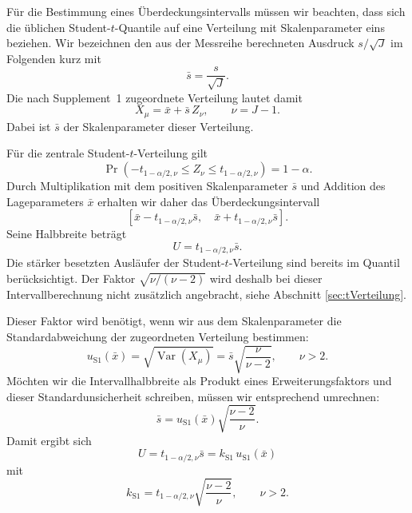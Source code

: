 Für die Bestimmung eines Überdeckungsintervalls müssen wir beachten,
dass sich die üblichen Student-$t$-Quantile auf eine Verteilung
mit Skalenparameter eins beziehen.
Wir bezeichnen den aus der Messreihe berechneten Ausdruck
$s/\sqrt J$ im Folgenden kurz mit
\begin{equation}
\bar s=\frac{s}{\sqrt J}.
\end{equation}
Die nach Supplement~1 zugeordnete Verteilung lautet damit
\begin{equation}
X_\mu=\bar x+\bar s\,Z_\nu,
\qquad \nu=J-1.
\end{equation}
Dabei ist $\bar s$ der Skalenparameter dieser Verteilung.

Für die zentrale Student-$t$-Verteilung gilt
\begin{equation}
\Pr\!\left(
-t_{1-\alpha/2,\nu}
\leq Z_\nu
\leq t_{1-\alpha/2,\nu}
\right)
=1-\alpha.
\end{equation}
Durch Multiplikation mit dem positiven Skalenparameter $\bar s$
und Addition des Lageparameters $\bar x$ erhalten wir daher
das Überdeckungsintervall
\begin{equation}
\boxed{
\left[
\bar x-t_{1-\alpha/2,\nu}\bar s,
\quad
\bar x+t_{1-\alpha/2,\nu}\bar s
\right].
}
\end{equation}
Seine Halbbreite beträgt
\begin{equation}
U=t_{1-\alpha/2,\nu}\bar s.
\end{equation}
Die stärker besetzten Ausläufer der Student-$t$-Verteilung
sind bereits im Quantil berücksichtigt.
Der Faktor $\sqrt{\nu/(\nu-2)}$ wird deshalb bei dieser
Intervallberechnung nicht zusätzlich angebracht, siehe Abschnitt \ref{sec:tVerteilung}.

Dieser Faktor wird benötigt, wenn wir aus dem Skalenparameter
die Standardabweichung der zugeordneten Verteilung bestimmen:
\begin{equation}
u_{\mathrm{S1}}(\bar x)
=
\sqrt{\operatorname{Var}(X_\mu)}
=
\bar s\sqrt{\frac{\nu}{\nu-2}},
\qquad \nu>2.
\end{equation}
Möchten wir die Intervallhalbbreite als Produkt eines
Erweiterungsfaktors und dieser Standardunsicherheit schreiben,
müssen wir entsprechend umrechnen:
\begin{equation}
\bar s
=
u_{\mathrm{S1}}(\bar x)
\sqrt{\frac{\nu-2}{\nu}}.
\end{equation}
Damit ergibt sich
\begin{equation}
U
=
t_{1-\alpha/2,\nu}\bar s
=
k_{\mathrm{S1}}\,u_{\mathrm{S1}}(\bar x)
\end{equation}
mit
\begin{equation}
\boxed{
k_{\mathrm{S1}}
=
t_{1-\alpha/2,\nu}
\sqrt{\frac{\nu-2}{\nu}},
\qquad \nu>2.
}
\end{equation}

